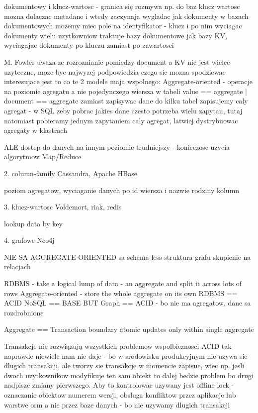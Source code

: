 dokumentowy i klucz-wartosc - granica się rozmywa
np. do baz klucz wartosc mozna dolaczac metadane i wtedy zaczynaja wygladac jak dokumenty
w bazach dokumentowych mozemy miec pole na identyfikator - klucz i po nim wyciagac dokumenty
wielu uzytkowniow traktuje bazy dokumentowe jak bazy KV, wyciagajac dokumenty po kluczu zamiast po zawartosci

M. Fowler uwaza ze rozroznianie pomiedzy document a KV nie jest wielce uzyteczne, moze byc najwyzej podpowiedzia czego sie mozna spodziewac
interesujace jest to co te 2 modele maja wspolnego:
Aggregate-oriented - operacje na poziomie agregatu a nie pojedynczego wiersza w tabeli
value == aggregate   |  document == aggregate
zamiast zapisywac dane do kilku tabel zapisujemy caly agregat
- w SQL zeby pobrac jakies dane czesto potrzeba wielu zapytan,
tutaj natomiast pobieramy jednym zapytaniem caly agregat, latwiej dystrybuowac
agregaty w klastrach

ALE dostep do danych na innym poziomie trudniejszy - konieczosc uzycia algorytmow Map/Reduce



2. column-family
Cassandra, Apache HBase

poziom agregatow, wyciaganie danych po id wiersza i nazwie rodziny kolumn

3. klucz-wartosc
Voldemort, riak, redis

lookup data by key

4. grafowe
Neo4j

NIE SA AGGREGATE-ORIENTED
sa schema-less
struktura grafu
skupienie na relacjach

RDBMS - take a logical lump of data - an aggregate and split it across lots of rows
Aggregate-oriented - store the whole aggregate on its own
RDBMS == ACID
NoSQL == BASE BUT Graph == ACID - bo nie ma agregatow, dane sa rozdrobnione

Aggregate == Transaction boundary
atomic updates only within single aggregate

Transakcje nie rozwiązują wszystkich problemow wspolbieznosci
ACID tak naprawde niewiele nam nie daje - bo w srodowisku produkcyjnym nie uzywa sie dlugich transakcji, ale tworzy sie transakcje w momencie zapisue, wiec np. jesli dwoch uzytkownikow modyfikuje ten sam obiekt to dalej bedzie problem bo drugi nadpisze zmiany pierwszego. Aby to kontrolowac uzywany jest offline lock - oznaczanie obiektow numerem wersji, obsluga konfliktow przez aplikacje lub warstwe orm a nie przez baze danych - bo nie uzywamy dlugich transakcji

